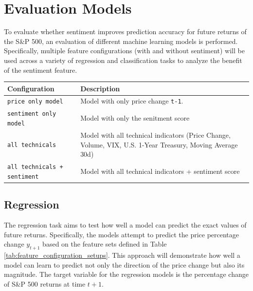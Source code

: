 \documentclass[Master,english,IEEE]{twbook}
\begin{document}
\section{Evaluation Models} \label{ch:eval_chapter}
To evaluate whether sentiment improves prediction accuracy for future returns of the S\&P 500, an evaluation of different machine learning models is performed. Specifically, multiple feature configurations (with and without sentiment) will be used across a variety of regression and classification tasks to analyze the benefit of the sentiment feature.

\par\vspace{2ex}
\begin{minipage}{\linewidth}
    \centering
    \small
    \begin{tabularx}{0.98\linewidth}{|l|X|}
    \hline
    \textbf{Configuration} & \textbf{Description} \\ \hline
    \texttt{price only model} & Model with only price change \texttt{t-1}. \\ \hline
    \texttt{sentiment only model} & Model with only the senitment score \\ \hline
    \texttt{all technicals} & Model with all technical indicators (Price Change, Volume, VIX, U.S. 1-Year Treasury, Moving Average 30d) \\ \hline
    \texttt{all technicals + sentiment} & Model with all technical indicators + sentiment score \\ \hline
    \end{tabularx}
    \label{tab:feature_configuration_setups}
\end{minipage}
\par\vspace{1ex}

\subsection{Regression}
The regression task aims to test how well a model can predict the exact values of future returns. Specifically, the models attempt to predict the price percentage change $y_{t+1}$ based on the feature sets defined in Table \ref{tab:feature_configuration_setups}. This approach will demonstrate how well a model can learn to predict not only the direction of the price change but also its magnitude.
The target variable for the regression models is the percentage change of S\&P 500 returns at time $t+1$.
\end{document}

